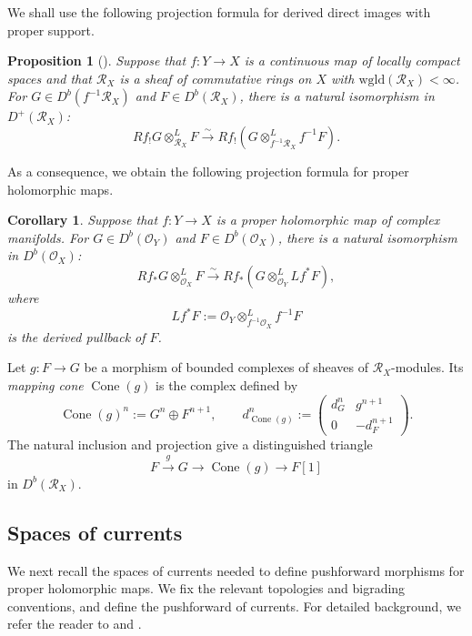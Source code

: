 \documentclass[11pt]{amsart}
\numberwithin{equation}{section}
\theoremstyle{plain}
\newtheorem{Cor}[thm]{Corollary}
\newtheorem{Pro}[thm]{Proposition}
\theoremstyle{definition}
\begin{document}
We shall use the following projection formula for derived direct images with
proper support.

\begin{Pro}[{\cite[Proposition 2.6.6]{KS}}]
Suppose that $f:Y\longrightarrow X$ is a continuous map of locally compact
spaces and that $\mathcal{R}_X$ is a sheaf of commutative rings on $X$ with
$\mathrm{wgld}(\mathcal{R}_X)<\infty$.  For
$G\in D^b(f^{-1}\mathcal{R}_X)$ and $F\in D^b(\mathcal{R}_X)$, there is a natural
isomorphism in $D^+(\mathcal{R}_X)$:
\[Rf_!G\otimes^L_{\mathcal{R}_X}F \xrightarrow{\sim} Rf_!(G\otimes^L_{f^{-1}\mathcal{R}_X}f^{-1}F).  \]
\end{Pro}

As a consequence, we obtain the following projection formula for proper
holomorphic maps.
\begin{Cor}\label{cor-derived-projection-formula}
Suppose that $f:Y\longrightarrow X$ is a proper holomorphic map of complex
manifolds.  For $G\in D^b(\mathcal O_Y)$ and $F\in D^b(\mathcal O_X)$,
there is a natural isomorphism in $D^b(\mathcal O_X)$:
\[Rf_*G\otimes^L_{\mathcal{O}_X}F \xrightarrow{\sim} Rf_*(G\otimes^L_{\mathcal{O}_Y}Lf^{*}F),  \]
where
\[
Lf^*F:=\mathcal O_Y\otimes^L_{f^{-1}\mathcal O_X}f^{-1}F
\]
is the \emph{derived pullback} of $F$.
\end{Cor}

Let $g:F\longrightarrow G$ be a morphism of bounded complexes of sheaves
of $\mathcal R_X$-modules.  Its \emph{mapping cone} $\operatorname{Cone}(g)$
is the complex defined by
\[
\operatorname{Cone}(g)^n:=G^n\oplus F^{n+1},
\qquad
d_{\operatorname{Cone}(g)}^n:=
\begin{pmatrix}
d_G^n & g^{n+1}\\
0 & -d_F^{n+1}
\end{pmatrix}.
\]
The natural inclusion and projection give a distinguished triangle
\[
F\xrightarrow{g}G\longrightarrow\operatorname{Cone}(g)
\longrightarrow F[1]
\]
in $D^b(\mathcal R_X)$.

\subsection{Spaces of currents}
We next recall the spaces of currents needed to define pushforward morphisms
for proper holomorphic maps.  We fix the relevant topologies and bigrading
conventions, and define the pushforward of currents.  For detailed
background, we refer the reader to \cite[\S~1]{King} and \cite[\S~I.2]{De}.
\end{document}
